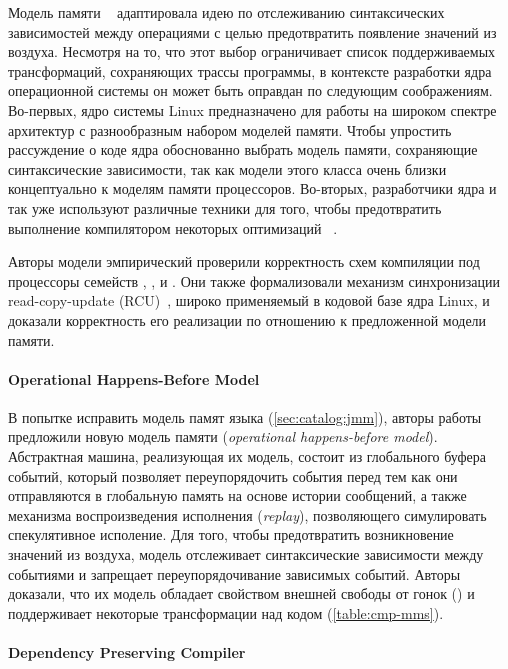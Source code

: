Модель памяти \LKMM~\cite{Alglave-al:ASPLOS18} 
адаптировала идею по отслеживанию синтаксических зависимостей
между операциями с целью предотвратить появление значений из воздуха. 
Несмотря на то, что этот выбор ограничивает список поддерживаемых 
трансформаций, сохраняющих трассы программы, 
в контексте разработки ядра операционной системы 
он может быть оправдан по следующим соображениям. 
Во-первых, ядро системы Linux предназначено для работы 
на широком спектре архитектур с разнообразным 
набором моделей памяти. Чтобы упростить рассуждение о коде ядра
обоснованно выбрать модель памяти, сохраняющие синтаксические зависимости, 
так как модели этого класса очень близки концептуально к 
моделям памяти процессоров. 
Во-вторых, разработчики ядра и так уже используют 
различные техники для того, чтобы предотвратить
выполнение компилятором некоторых оптимизаций~%
\cite{Alglave-al:ASPLOS18, LK-MemBarriers, LK-RCU-Deref}.

Авторы модели эмпирический проверили корректность схем 
компиляции под процессоры семейств \Intel, ,  и \POWER. 
Они также формализовали механизм синхронизации 
read-copy-update (RCU)~\cite{McKenney-RCU2007}, 
широко применяемый в кодовой базе ядра Linux, 
и доказали корректность его реализации 
по отношению к предложенной модели памяти. 

\paragraph{Operational Happens-Before Model}

В попытке исправить модель памят языка \Java (\see \cref{sec:catalog:jmm}), 
авторы работы~\cite{Zhang-Feng:FCS16} предложили новую модель памяти \OHMM
(\emph{operational happens-before model}).
Абстрактная машина, реализующая их модель, 
состоит из глобального буфера событий, 
который позволяет переупорядочить события перед тем 
как они отправляются в глобальную память на основе истории сообщений, 
а также механизма воспроизведения исполнения (\emph{replay}), 
позволяющего симулировать спекулятивное исполение. 
Для того, чтобы предотвратить возникновение значений из воздуха, 
модель отслеживает синтаксические зависимости между 
событиями и запрещает переупорядочивание зависимых событий. 
Авторы доказали, что их модель обладает свойством внешней свободы от гонок (\eDRF)
и поддерживает некоторые трансформации над кодом 
(\see \cref{table:cmp-mms}).

\paragraph{Dependency Preserving Compiler}

